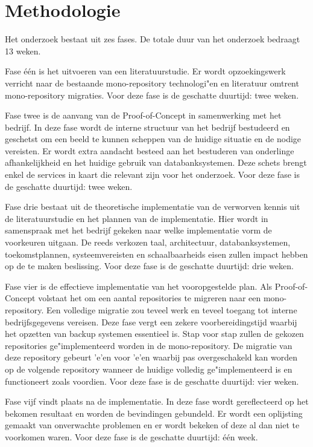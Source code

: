 \documentclass{hogent-article}
\begin{document}
\section{Methodologie}
Het onderzoek bestaat uit zes fases. 
De totale duur van het onderzoek bedraagt 13 weken.

Fase \'e\'en is het uitvoeren van een literatuurstudie. Er wordt opzoekingswerk verricht naar de bestaande mono-repository technologi"en en literatuur omtrent mono-repository migraties. Voor deze fase is de geschatte duurtijd: twee weken. 

Fase twee is de aanvang van de Proof-of-Concept in samenwerking met het bedrijf. In deze fase wordt de interne structuur van het bedrijf bestudeerd en geschetst om een beeld te kunnen scheppen van de huidige situatie en de nodige vereisten. Er wordt extra aandacht besteed aan het bestuderen van onderlinge afhankelijkheid en het huidige gebruik van databanksystemen. Deze schets brengt enkel de services in kaart die relevant zijn voor het onderzoek. Voor deze fase is de geschatte duurtijd: twee weken.

Fase drie bestaat uit de theoretische implementatie van de verworven kennis uit de literatuurstudie en het plannen van de implementatie. Hier wordt in samenspraak met het bedrijf gekeken naar welke implementatie vorm de voorkeuren uitgaan. De reeds verkozen taal, architectuur, databanksystemen, toekomstplannen, systeemvereisten en schaalbaarheids eisen zullen impact hebben op de te maken beslissing. Voor deze fase is de geschatte duurtijd: drie weken.

Fase vier is de effectieve implementatie van het vooropgestelde plan. Als Proof-of-Concept volstaat het om een aantal repositories te migreren naar een mono-repository. Een volledige migratie zou teveel werk en teveel toegang tot interne bedrijfsgegevens vereisen. Deze fase vergt een zekere voorbereidingstijd waarbij het opzetten van backup systemen essentieel is. Stap voor stap zullen de gekozen repositories ge"implementeerd worden in de mono-repository. De migratie van deze repository gebeurt 'e'en voor 'e'en waarbij pas overgeschakeld kan worden op de volgende repository wanneer de huidige volledig ge"implementeerd is en functioneert zoals voordien. Voor deze fase is de geschatte duurtijd: vier weken.

Fase vijf vindt plaats na de implementatie. In deze fase wordt gereflecteerd op het bekomen resultaat en worden de bevindingen gebundeld. Er wordt een oplijsting gemaakt van onverwachte problemen en er wordt bekeken of deze al dan niet te voorkomen waren. Voor deze fase is de geschatte duurtijd: \'e\'en week.
\end{document}
